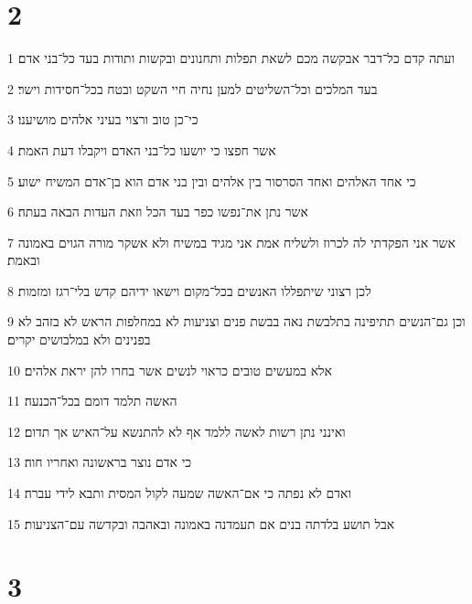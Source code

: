 \chapter{2}

\par 1 ועתה קדם כל־דבר אבקשה מכם לשאת תפלות ותחנונים ובקשות ותודות בעד כל־בני אדם׃
\par 2 בעד המלכים וכל־השליטים למען נחיה חיי השקט ובטח בכל־חסידות וישר׃
\par 3 כי־כן טוב ורצוי בעיני אלהים מושיענו׃
\par 4 אשר חפצו כי יושעו כל־בני האדם ויקבלו דעת האמת׃
\par 5 כי אחד האלהים ואחד הסרסור בין אלהים ובין בני אדם הוא בן־אדם המשיח ישוע׃
\par 6 אשר נתן את־נפשו כפר בעד הכל וזאת העדות הבאה בעתה׃
\par 7 אשר אני הפקדתי לה לכרוז ולשליח אמת אני מגיד במשיח ולא אשקר מורה הגוים באמונה ובאמת׃
\par 8 לכן רצוני שיתפללו האנשים בכל־מקום וישאו ידיהם קדש בלי־רגז ומזמות׃
\par 9 וכן גם־הנשים תתיפינה בתלבשת נאה בבשת פנים וצניעות לא במחלפות הראש לא בזהב לא בפנינים ולא במלבושים יקרים׃
\par 10 אלא במעשים טובים כראוי לנשים אשר בחרו להן יראת אלהים׃
\par 11 האשה תלמד דומם בכל־הכנעה׃
\par 12 ואינני נתן רשות לאשה ללמד אף לא להתנשא על־האיש אך תדום׃
\par 13 כי אדם נוצר בראשונה ואחריו חוה׃
\par 14 ואדם לא נפתה כי אם־האשה שמעה לקול המסית ותבא לידי עברה׃
\par 15 אבל תושע בלדתה בנים אם תעמדנה באמונה ובאהבה ובקדשה עם־הצניעות׃

\chapter{3}

